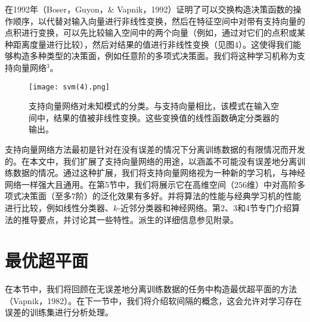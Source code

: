 \documentclass[lang=cn,11pt,a4paper]{elegantpaper}
\begin{document}
	在1992年（Boser，Guyon，\& Vapnik，1992）证明了可以交换构造决策函数的操作顺序，以代替对输入向量进行非线性变换，然后在特征空间中对带有支持向量的点积进行变换，可以先比较输入空间中的两个向量（例如，通过对它们的点积或某种距离度量进行比较），然后对结果的值进行非线性变换（见图4）。这使得我们能够构造多种类型的决策面，例如任意阶的多项式决策面。我们将这种学习机称为支持向量网络$^3$。
	\begin{figure}[htbp]
		\centering
		\texttt{[image: svm(4).png]}
		\caption{支持向量网络对未知模式的分类。与支持向量相比，该模式在输入空间中，结果的值被非线性变换。这些变换值的线性函数确定分类器的输出。}
	\end{figure}
	支持向量网络方法最初是针对在没有误差的情况下分离训练数据的有限情况而开发的。在本文中，我们扩展了支持向量网络的用途，以涵盖不可能没有误差地分离训练数据的情况。通过这种扩展，我们将支持向量网络视为一种新的学习机，与神经网络一样强大且通用。在第5节中，我们将展示它在高维空间（$256$维）中对高阶多项式决策面（至多$7$阶）的泛化效果有多好。并将算法的性能与经典学习机的性能进行比较，例如线性分类器、$k$-近邻分类器和神经网络。第2、3和4节专门介绍算法的推导要点，并讨论其一些特性。派生的详细信息参见附录。

	\section{最优超平面}
	在本节中，我们将回顾在无误差地分离训练数据的任务中构造最优超平面的方法（Vapnik，1982）。在下一节中，我们将介绍软间隔的概念，这会允许对学习存在误差的训练集进行分析处理。
\end{document}
